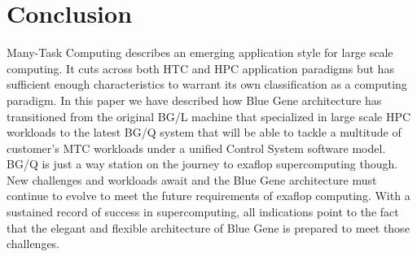 \section{Conclusion}

Many-Task Computing describes an emerging application style for large scale computing. 
It cuts across both HTC and HPC application paradigms but has sufficient enough 
characteristics to warrant its own classification as a computing paradigm. In this
paper we have described how Blue Gene architecture has transitioned from the original
BG/L machine that
specialized in large scale HPC workloads to the latest BG/Q system that will be able to tackle 
a multitude of 
customer's MTC workloads under a unified 
Control System software model. BG/Q is just a way station on the journey to exaflop 
supercomputing though. New challenges and workloads await and the Blue Gene architecture 
must continue to evolve to meet the future requirements of exaflop computing. 
With a sustained record of success in supercomputing, all indications point 
to the fact that the elegant and flexible architecture of Blue Gene is prepared 
to meet those challenges. 

